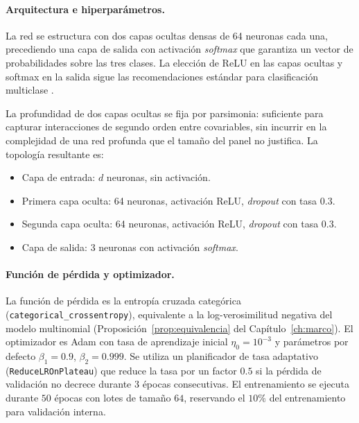 \paragraph{Arquitectura e hiperpar\'ametros.} La red se estructura con dos capas ocultas densas de 64 neuronas cada una, precediendo una capa de salida con activaci\'on \emph{softmax} que garantiza un vector de probabilidades sobre las tres clases. La elecci\'on de ReLU en las capas ocultas y softmax en la salida sigue las recomendaciones est\'andar para clasificaci\'on multiclase \cite{solorzano2025rn}.

La profundidad de dos capas ocultas se fija por parsimonia: suficiente para capturar interacciones de segundo orden entre covariables, sin incurrir en la complejidad de una red profunda que el tama\~no del panel no justifica. La topolog\'ia resultante es:
\begin{itemize}
	\item Capa de entrada: $d$ neuronas, sin activaci\'on.
	\item Primera capa oculta: 64 neuronas, activaci\'on ReLU, \emph{dropout} con tasa $0{.}3$.
	\item Segunda capa oculta: 64 neuronas, activaci\'on ReLU, \emph{dropout} con tasa $0{.}3$.
	\item Capa de salida: 3 neuronas con activaci\'on \emph{softmax}.
\end{itemize}

\paragraph{Funci\'on de p\'erdida y optimizador.} La funci\'on de p\'erdida es la entrop\'ia cruzada categ\'orica (\texttt{categorical\_crossentropy}), equivalente a la log-verosimilitud negativa del modelo multinomial (Proposici\'on~\ref{prop:equivalencia} del Cap\'itulo~\ref{ch:marco}). El optimizador es Adam con tasa de aprendizaje inicial $\eta_0 = 10^{-3}$ y par\'ametros por defecto $\beta_1 = 0{.}9$, $\beta_2 = 0{.}999$. Se utiliza un planificador de tasa adaptativo (\texttt{ReduceLROnPlateau}) que reduce la tasa por un factor $0{.}5$ si la p\'erdida de validaci\'on no decrece durante $3$ \'epocas consecutivas. El entrenamiento se ejecuta durante $50$ \'epocas con lotes de tama\~no $64$, reservando el $10\%$ del entrenamiento para validaci\'on interna.

